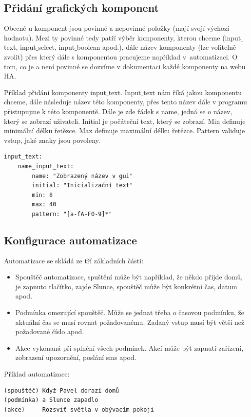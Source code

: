 \subsection{Přidání grafických komponent}
Obecně u komponent jsou povinné a nepovinné položky (mají svojí výchozí hodnotu). Mezi ty povinné tedy patří výběr komponenty, kterou chceme (input$\_$text, input$\_$select, input$\_$boolean apod.), dále název komponenty (lze volitelně zvolit) přes který dále s komponentou pracujeme například v~automatizaci. O tom, co je a není povinné se dozvíme v dokumentaci každé komponenty na webu HA.

Příklad přidání komponenty input$\_$text. Input$\_$text nám říká jakou komponentu chceme, dále následuje název této komponenty, přes tento název dále v programu přistupujme k této komponentě. Dále je zde řádek s name,
jedná se o název, který se zobrazí uživateli. Initial je počáteční text, který se zobrazí. Min definuje minimální délku řetězce. Max definuje maximální délku řetězce. Pattern validuje vstup, jaké znaky jsou povoleny.

\begin{lstlisting}
input_text:
	name_input_text:
		name: "Zobrazený název v gui"
		initial: "Inicializační text"
		min: 8
		max: 40
		pattern: "[a-fA-F0-9]*"
\end{lstlisting}

\subsection{Konfigurace automatizace}

Automatizace se skládá ze tří základních částí:

\begin{itemize}
\item Spouštěč automatizace, spuštění může být například, že někdo přijde
domů, je zapnuto tlačítko, zajde Slunce, spouštěč může být konkrétní
čas, datum apod.
\item Podmínka omezující spouštěč. Může se jednat třeba o časovou podmínku, že aktuální čas se musí rovnat požadovanému. Zadaný vstup musí
být větší než požadované číslo apod.
\item Akce vykonaná při splnění všech podmínek. Akcí může být zapnutí
zařízení, zobrazení upozornění, poslání sms apod.
\end{itemize}

Příklad automatizace:

\begin{lstlisting}
(spouštěč) Když Pavel dorazí domů
(podmínka) a Slunce zapadlo
(akce) 	   Rozsviť světla v obývacím pokoji
\end{lstlisting}

